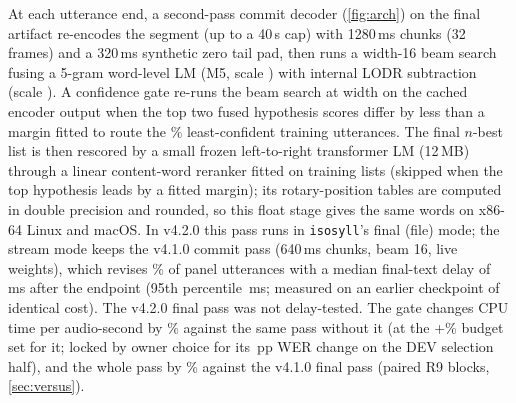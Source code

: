  At each utterance end, a second-pass
commit decoder (\cref{fig:arch}) on the final artifact re-encodes the segment (up to a 40\,s cap) with
1280\,ms chunks (32 frames) and a 320\,ms synthetic zero tail pad, then runs a width-16 beam search fusing a
5-gram word-level LM (M5, scale \LmScale) with internal LODR subtraction (scale \LodrScale). A confidence
gate re-runs the beam search at width \FinGateWideBeam{} on the cached encoder output when the top two fused hypothesis
scores differ by less than a margin fitted to route the \FinGateTrainPct\% least-confident training utterances. The
final $n$-best list is then rescored by a small frozen left-to-right transformer LM (12\,MB) through a
linear content-word reranker fitted on training lists (skipped when the top hypothesis leads by a fitted margin); its rotary-position tables are computed in double precision
and rounded, so this float stage gives the same words on x86-64 Linux and macOS. In
v4.2.0 this pass runs in \texttt{isosyll}'s final (file) mode; the stream mode keeps the v4.1.0 commit pass
(640\,ms chunks, beam 16, live weights), which revises \RelCommitRevisedPct\% of panel utterances with a median
final-text delay of \RelCommitDelayPfifty\,ms after the endpoint (95th percentile
\RelCommitDelayPninetyFive\,ms; measured on an earlier checkpoint of identical cost). The v4.2.0 final pass
was not delay-tested. The gate changes CPU time per audio-second by \FinGateCpuPct\% against the same pass
without it (at the +\FinGateBudgetPct\% budget set for it; locked by owner choice for its \FinSBaseDelta\,pp WER change on the DEV selection half), and the whole
pass by \FinCostCpuPct\% against the v4.1.0 final pass (paired R9 blocks, \cref{sec:versus}).

